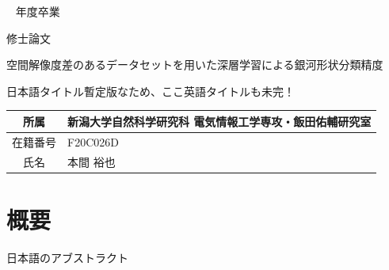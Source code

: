 \documentclass[a4j, 11pt]{jreport}
\newcounter{fiscal_year}         %
\begin{document}
\begin{titlepage}\Large ~
{\normalsize \the\value{fiscal_year} 年度卒業}
\vfill
\begin{center}

{\Huge 修士論文}
\end{center}
\begin{center}

空間解像度差のあるデータセットを用いた深層学習による銀河形状分類精度
\end{center}
\begin{center}

日本語タイトル暫定版なため、ここ英語タイトルも未完！
\end{center}
\vfill
\begin{center}
\begin{tabular}{|c|l|}
\hline

所属 & 新潟大学自然科学研究科 電気情報工学専攻・飯田佑輔研究室 \\
\hline

在籍番号 & F20C026D \\
\hline

氏名 & 本間 裕也 \\
\hline
\end{tabular}
\end{center}
\vspace{1cm}
\vfill
\end{titlepage}
\pagebreak
\addtocounter{page}{1}
\thispagestyle{empty}  %

\chapter*{概要}
日本語のアブストラクト
\end{document}
